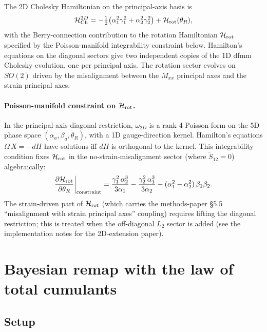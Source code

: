 \documentclass[11pt]{article}
\newcommand{\half}{\tfrac{1}{2}}
\begin{document}
The 2D Cholesky Hamiltonian on the principal-axis basis is
\begin{equation}
  \mathcal{H}^{2D}_{\rm Ch} = -\half\bigl(\alpha_1^2\gamma_1^2 + \alpha_2^2\gamma_2^2\bigr) + \mathcal{H}_{\rm rot}(\theta_R),
  \label{eq:H-2D}
\end{equation}
with the Berry-connection contribution to the rotation Hamiltonian
$\mathcal{H}_{\rm rot}$ specified by the Poisson-manifold integrability
constraint below. Hamilton's equations on the diagonal
sectors give two independent copies of the 1D dfmm Cholesky
evolution, one per principal axis. The rotation sector evolves on
$SO(2)$ driven by the misalignment between the $M_{xx}$ principal
axes and the strain principal axes.

\paragraph{Poisson-manifold constraint on $\mathcal{H}_{\rm rot}$.} In the
principal-axis-diagonal restriction, $\omega_{2D}$ is a rank-4 Poisson
form on the 5D phase space $(\alpha_a, \beta_a, \theta_R)$, with a 1D
gauge-direction kernel. Hamilton's equations $\Omega\,X = -dH$ have
solutions iff $dH$ is orthogonal to the kernel. This integrability
condition fixes $\mathcal{H}_{\rm rot}$ in the no-strain-misalignment
sector (where $\tilde S_{12} = 0$) algebraically:
\begin{equation}
  \frac{\partial \mathcal{H}_{\rm rot}}{\partial \theta_R}\bigg|_{\rm constraint}
  = \frac{\gamma_1^2\,\alpha_2^3}{3\alpha_1} - \frac{\gamma_2^2\,\alpha_1^3}{3\alpha_2}
    - (\alpha_1^2 - \alpha_2^2)\,\beta_1\beta_2.
  \label{eq:H-rot-constraint}
\end{equation}
The strain-driven part of $\mathcal{H}_{\rm rot}$ (which carries the
methods-paper §5.5 ``misalignment with strain principal axes'' coupling)
requires lifting the diagonal restriction; this is treated when the
off-diagonal $L_2$ sector is added (see the implementation notes for
the 2D-extension paper).

\section{Bayesian remap with the law of total cumulants}
\label{sec:remap}

\subsection{Setup}
\end{document}
